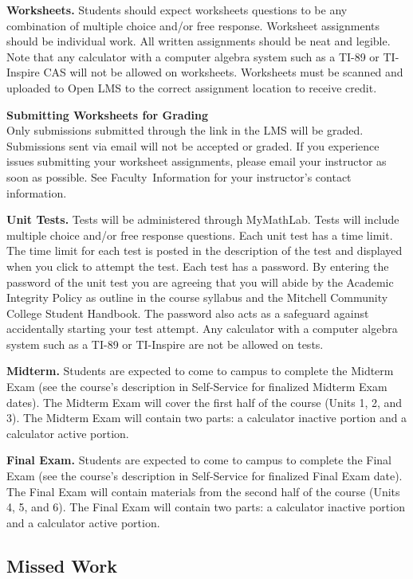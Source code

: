 \documentclass[11pt]{article}
\renewenvironment{framed}[1][]{%
  \def\FrameCommand{%
    \hspace{1pt}%
    {\color{mybordercolor}\vrule width 2pt} %
    \hspace{1pt}%
    \fboxsep=\FrameSep%
    \colorbox{mybgcolor}%
  }%
  \MakeFramed {\advance\hsize-\width \FrameRestore}%
}{%
  \endMakeFramed
}
\begin{document}
\textbf{Worksheets.} Students should expect worksheets questions to be any combination of multiple choice and/or free response. Worksheet assignments should be individual work. All written assignments should be neat and legible. Note that any calculator with a computer algebra system such as a TI-89 or TI-Inspire CAS will not be allowed on worksheets. Worksheets must be scanned and uploaded to Open LMS to the correct assignment location to receive credit.

\begin{framed}
\textbf{Submitting Worksheets for Grading}\\
Only submissions submitted through the link in the LMS will be graded. Submissions sent via email will not be accepted or graded. If you experience issues submitting your worksheet assignments, please email your instructor as soon as possible. See Faculty~Information for your instructor's contact information.
\end{framed}

\textbf{Unit Tests.} Tests will be administered through MyMathLab. Tests will include multiple choice and/or free response questions. Each unit test has a time limit. The time limit for each test is posted in the description of the test and displayed when you click to attempt the test. Each test has a password. By entering the password of the unit test you are agreeing that you will abide by the Academic Integrity Policy as outline in the course syllabus and the Mitchell Community College Student Handbook. The password also acts as a safeguard against accidentally starting your test attempt. Any calculator with a computer algebra system such as a TI-89 or TI-Inspire are not be allowed on tests.

\textbf{Midterm.} Students are expected to come to campus to complete the Midterm Exam (see the course's description in Self-Service for finalized Midterm Exam dates). The Midterm Exam will cover the first half of the course (Units 1, 2, and 3). The Midterm Exam will contain two parts: a calculator inactive portion and a calculator active portion.

\textbf{Final Exam.} Students are expected to come to campus to complete the Final Exam (see the course's description in Self-Service for finalized Final Exam date). The Final Exam will contain materials from the second half of the course (Units 4, 5, and 6). The Final Exam will contain two parts: a calculator inactive portion and a calculator active portion.

\subsection{Missed Work}
\end{document}
